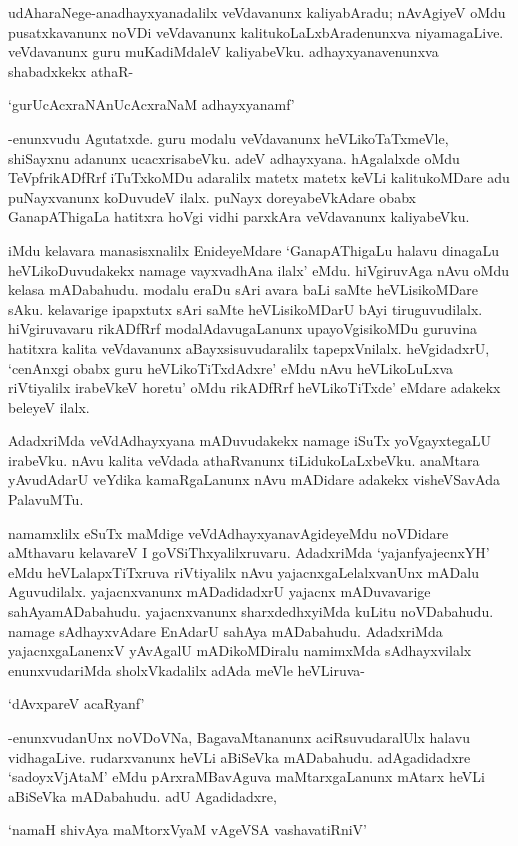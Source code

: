 udAharaNege-anadhayxyanadalilx veVdavanunx kaliyabAradu; nAvAgiyeV oMdu pusatxkavanunx noVDi veVdavanunx kalitukoLaLxbAradenunxva niyamagaLive. veVdavanunx guru muKadiMdaleV kaliyabeVku. adhayxyanavenunxva shabadxkekx athaR- 

\begin{shloka}
`gurUcAcxraNAnUcAcxraNaM adhayxyanamf'
\end{shloka}

-enunxvudu Agutatxde. guru modalu veVdavanunx heVLikoTaTxmeVle, shiSayxnu adanunx ucacxrisabeVku. adeV adhayxyana. hAgalalxde oMdu TeVpfrikADfRrf iTuTxkoMDu adaralilx matetx matetx keVLi kalitukoMDare adu puNayxvanunx koDuvudeV ilalx. puNayx doreyabeVkAdare obabx GanapAThigaLa hatitxra hoVgi vidhi parxkAra veVdavanunx kaliyabeVku.

iMdu kelavara manasisxnalilx EnideyeMdare `GanapAThigaLu halavu dinagaLu heVLikoDuvudakekx namage vayxvadhAna ilalx' eMdu. hiVgiruvAga nAvu oMdu kelasa mADabahudu. modalu eraDu sAri avara baLi saMte heVLisikoMDare sAku. kelavarige ipapxtutx sAri saMte heVLisikoMDarU bAyi tiruguvudilalx. hiVgiruvavaru rikADfRrf modalAdavugaLanunx upayoVgisikoMDu guruvina hatitxra kalita veVdavanunx aBayxsisuvudaralilx tapepxVnilalx. heVgidadxrU, `cenAnxgi obabx guru heVLikoTiTxdAdxre' eMdu nAvu heVLikoLuLxva riVtiyalilx irabeVkeV horetu' oMdu rikADfRrf heVLikoTiTxde' eMdare adakekx beleyeV ilalx.

AdadxriMda veVdAdhayxyana mADuvudakekx namage iSuTx yoVgayxtegaLU irabeVku. nAvu kalita veVdada athaRvanunx tiLidukoLaLxbeVku. anaMtara yAvudAdarU veYdika kamaRgaLanunx nAvu mADidare adakekx visheVSavAda PalavuMTu.

namamxlilx eSuTx maMdige veVdAdhayxyanavAgideyeMdu noVDidare aMthavaru kelavareV I goVSiThxyalilxruvaru. AdadxriMda `yajanfyajecnxYH' eMdu heVLalapxTiTxruva riVtiyalilx nAvu yajacnxgaLelalxvanUnx mADalu Aguvudilalx. yajacnxvanunx mADadidadxrU yajacnx mADuvavarige sahAyamADabahudu. yajacnxvanunx sharxdedhxyiMda kuLitu noVDabahudu. namage sAdhayxvAdare EnAdarU sahAya mADabahudu. AdadxriMda yajacnxgaLanenxV yAvAgalU mADikoMDiralu namimxMda sAdhayxvilalx enunxvudariMda sholxVkadalilx adAda meVle heVLiruva-

`dAvxpareV acaRyanf'

-enunxvudanUnx noVDoVNa, BagavaMtananunx aciRsuvudaralUlx halavu vidhagaLive. rudarxvanunx heVLi aBiSeVka mADabahudu. adAgadidadxre `sadoyxVjAtaM' eMdu pArxraMBavAguva maMtarxgaLanunx mAtarx heVLi aBiSeVka mADabahudu. adU Agadidadxre,

\begin{shloka}
`namaH shivAya maMtorxV\s yaM vAgeVSA vashavatiRniV'
\end{shloka}

